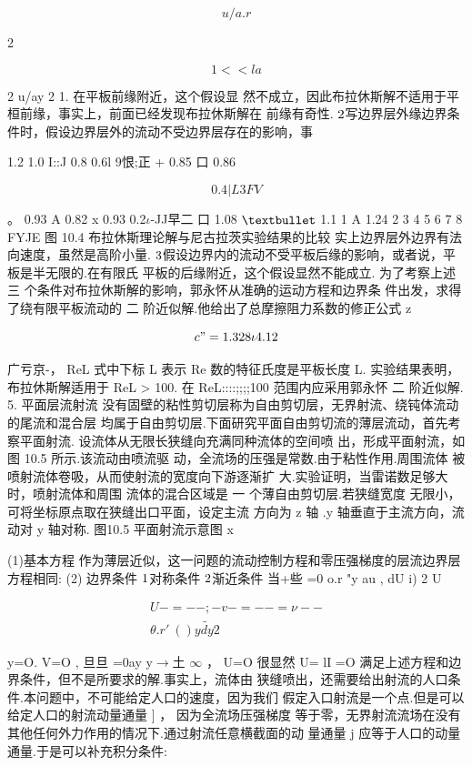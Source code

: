 \[u / a .r\]

2

\[1 << la\]

2 u/ay 2 1. 在平板前缘附近，这个假设显 然不成立，因此布拉休斯解不适用于平桓前缘，事实上，前面已经发现布拉休斯解在 前缘有奇性. ${\rm 2}$写边界层外缘边界条件时，假设边界层外的流动不受边界层存在的影响，事

1.2 1.0 I::J 0.8 0.6l 9恨;正 + 0.85 口 0.86

\[0.4| L3FV\]

。 0.93 A 0.82 x 0.93 0.2$\iota$-JJ早二 口 1.08 ${\rm •}$ 1.1 1 A 1.24 2 3 4 5 6 7 8 FYJE 图 10.4 布拉休斯理论解与尼古拉茨实验结果的比较 实上边界层外边界有法向速度，虽然是高阶小量. ${\rm 3}$假设边界内的流动不受平板后缘的影响，或者说，平板是半无限的.在有限氏 平板的后缘附近，这个假设显然不能成立. 为了考察上述 三 个条件对布拉休斯解的影响，郭永怀从准确的运动方程和边界条 件出发，求得了绕有限平板流动的 二 阶近似解.他给出了总摩擦阻力系数的修正公式 z

\[c" = 1. 328\iota 4.12\]

广亏京-， ReL 式中下标 L 表示 Re 数的特征氏度是平板长度 L. 实验结果表明，布拉休斯解适用于 ReL > 100. 在 ReL::::;;;;100 范围内应采用郭永怀 二 阶近似解. 5. 平面层流射流 没有固壁的粘性剪切层称为自由剪切层，无界射流、绕钝体流动的尾流和混合层 均属于自由剪切层.下面研究平面自由剪切流的薄层流动，首先考察平面射流. 设流体从无限长狭缝向充满同种流体的空间喷 出，形成平面射流，如图 10.5 所示.该流动由喷流驱 动，全流场的压强是常数.由于粘性作用.周围流体 被喷射流体卷吸，从而使射流的宽度向下游逐渐扩 大.实验证明，当雷诺数足够大时，喷射流体和周围 流体的混合区域是 一 个薄自由剪切层.若狭缝宽度 无限小，可将坐标原点取在狭缝出口平面，设定主流 方向为 z 轴 .y 轴垂直于主流方向，流动对 y 轴对称. 图10.5 平面射流示意图 x

(1)基本方程 作为薄层近似，这一问题的流动控制方程和零压强梯度的层流边界层方程相同: (2) 边界条件 ${\rm 1}$对称条件 ${\rm 2}$渐近条件 当+些 =0 o.r "y au , dU i) 2 U

\begin{gather*}
U -=-- ;- v -=-- =\nu --\\
\theta  .r ' ~ () y \tilde{dy}2
\end{gather*}

y=O. V=O , 旦旦 =0ay y$\rightarrow$土 $\infty$ ， U=O 很显然 U= lI =O 满足上述方程和边界条件，但不是所要求的解.事实上，流体由 狭缝喷出，还需要给出射流的人口条件.本问题中，不可能给定人口的速度，因为我们 假定入口射流是一个点.但是可以给定人口的射流动量通量 ] ， 因为全流场压强梯度 等于零，无界射流流场在没有其他任何外力作用的情况下.通过射流任意横截面的动 量通量 j 应等于人口的动量通量.于是可以补充积分条件:

